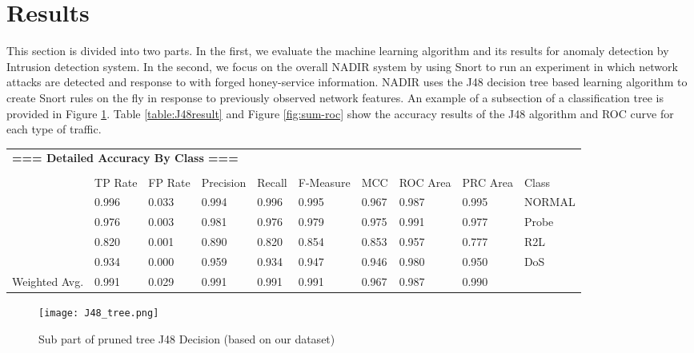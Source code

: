 \section{Results}
\label{results}

This section is divided into two parts. In the first, we evaluate the machine learning algorithm and its results for anomaly detection by Intrusion detection system. In the second, we
focus on the overall NADIR system by using Snort to run an experiment in which network attacks are detected and response to with forged honey-service information. NADIR uses the J48 decision tree based learning algorithm to create Snort rules on the fly in response to previously observed network features. An example of a subsection of a classification tree is provided in Figure \ref{fig:J48tree}. Table \ref{table:J48result} and Figure \ref{fig:sum-roc} show the accuracy results of the J48 algorithm and ROC curve for each type of traffic.

\begin{table*}
\begin{center}
\begin{tabular}[width=\textwidth]{llllllllll}
\multicolumn{10}{l}{\bfseries === Detailed Accuracy By Class ===}\\
\\
 & TP Rate & FP Rate & Precision & Recall & F-Measure & MCC & ROC Area & PRC Area & Class\\
 & 0.996 & 0.033 & 0.994 & 0.996 & 0.995 & 0.967 & 0.987 & 0.995 & NORMAL\\
 & 0.976 & 0.003 & 0.981 & 0.976 & 0.979 & 0.975 & 0.991 & 0.977 & Probe\\
 & 0.820 & 0.001 & 0.890 & 0.820 & 0.854 & 0.853 & 0.957 & 0.777 & R2L\\
 & 0.934 & 0.000 & 0.959 & 0.934 & 0.947 & 0.946 & 0.980 & 0.950 & DoS\\
 Weighted Avg. & 0.991 & 0.029 & 0.991 & 0.991 & 0.991 & 0.967 & 0.987 & 0.990 & \\
\end{tabular}
\end{center}
\caption{Accuracy Result of J48 algorithm (based on our dataset)}
\label{table:J48result}
\end{table*}

\begin{figure}[h!]
	\centering
	\texttt{[image: J48\_tree.png]}
	\caption{Sub part of pruned tree J48 Decision (based on our dataset)}
	\label{fig:J48tree}
\end{figure}

